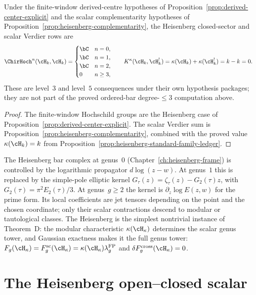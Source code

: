 \begin{corollary}
\label{cor:heisenberg-closed-sector-ledger}
Under the finite-window derived-centre hypotheses of
Proposition~\ref{prop:derived-center-explicit} and the scalar
complementarity hypotheses of
Proposition~\ref{prop:heisenberg-complementarity}, the Heisenberg
closed-sector and scalar Verdier rows are
\[
\ChirHoch^n(\cH_k,\cH_k)=
\begin{cases}
\bC & n=0,\\
\bC & n=1,\\
\bC & n=2,\\
0 & n\ge3,
\end{cases}
\qquad
K^\kappa(\cH_k,\cH_k^!)=\kappa(\cH_k)+\kappa(\cH_k^!)=k-k=0 .
\]
These are level~\(3\) and level~\(5\) consequences under their own
hypothesis packages; they are not part of the proved ordered-bar
degree-\(\leq3\) computation above.
\end{corollary}

\begin{proof}
The finite-window Hochschild groups are the Heisenberg case of
Proposition~\ref{prop:derived-center-explicit}. The scalar Verdier sum
is Proposition~\ref{prop:heisenberg-complementarity}, combined with
the proved value \(\kappa(\cH_k)=k\) from
Proposition~\ref{prop:heisenberg-standard-family-ledger}.
\end{proof}

The Heisenberg bar complex at genus~$0$
(Chapter~\ref{ch:heisenberg-frame}) is controlled by the logarithmic
propagator $d\log(z-w)$. At genus~$1$ this is replaced by the
simple-pole elliptic kernel
$G_\tau(z)=\zeta_\tau(z)-G_2(\tau)z$, with
$G_2(\tau)=\pi^2E_2(\tau)/3$. At genus~$g\ge2$ the kernel is
$\partial_z\log E(z,w)$ for the prime form. Its local coefficients
are jet tensors depending on the point and the chosen coordinate;
only their scalar contractions descend to modular or tautological
classes. The Heisenberg is the simplest nontrivial instance of
Theorem~D: the modular characteristic $\kappa(\cH_\kappa)$ determines
the scalar genus tower, and Gaussian exactness makes it the full
genus tower:
$F_g(\cH_\kappa)=F_g^{\mathrm{sc}}(\cH_\kappa)
=\kappa(\cH_\kappa)\lambda_g^{\mathrm{FP}}$ and
$\delta F_g^{\mathrm{cross}}(\cH_\kappa)=0$.

\section{The Heisenberg open--closed scalar}
\label{sec:heisenberg-theta-oc}

